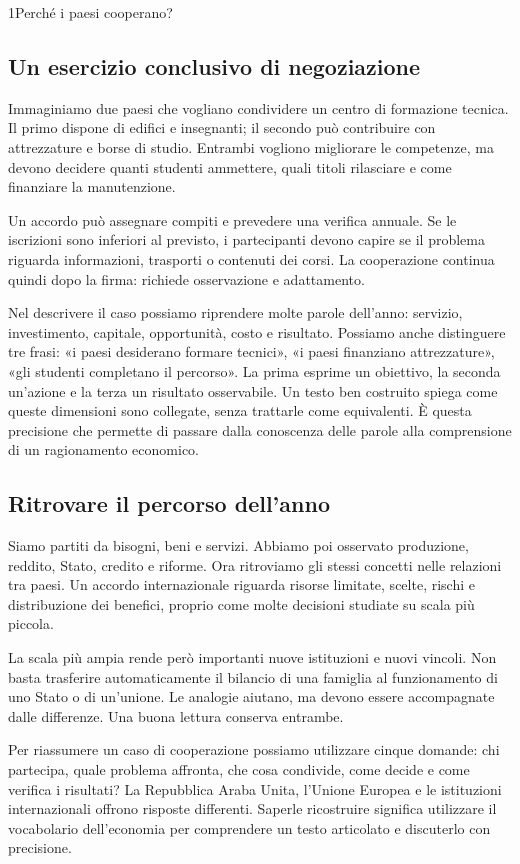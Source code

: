 \begin{lettura}{1}{Perché i paesi cooperano?}
\subsection*{Un esercizio conclusivo di negoziazione}
Immaginiamo due paesi che vogliano condividere un centro di formazione tecnica. Il primo dispone di edifici e insegnanti; il secondo può contribuire con attrezzature e borse di studio. Entrambi vogliono migliorare le competenze, ma devono decidere quanti studenti ammettere, quali titoli rilasciare e come finanziare la manutenzione.

Un accordo può assegnare compiti e prevedere una verifica annuale. Se le iscrizioni sono inferiori al previsto, i partecipanti devono capire se il problema riguarda informazioni, trasporti o contenuti dei corsi. La cooperazione continua quindi dopo la firma: richiede osservazione e adattamento.

Nel descrivere il caso possiamo riprendere molte parole dell'anno: servizio, investimento, capitale, opportunità, costo e risultato. Possiamo anche distinguere tre frasi: «i paesi desiderano formare tecnici», «i paesi finanziano attrezzature», «gli studenti completano il percorso». La prima esprime un obiettivo, la seconda un'azione e la terza un risultato osservabile. Un testo ben costruito spiega come queste dimensioni sono collegate, senza trattarle come equivalenti. È questa precisione che permette di passare dalla conoscenza delle parole alla comprensione di un ragionamento economico.

\subsection*{Ritrovare il percorso dell'anno}
Siamo partiti da bisogni, beni e servizi. Abbiamo poi osservato produzione, reddito, Stato, credito e riforme. Ora ritroviamo gli stessi concetti nelle relazioni tra paesi. Un accordo internazionale riguarda risorse limitate, scelte, rischi e distribuzione dei benefici, proprio come molte decisioni studiate su scala più piccola.

La scala più ampia rende però importanti nuove istituzioni e nuovi vincoli. Non basta trasferire automaticamente il bilancio di una famiglia al funzionamento di uno Stato o di un'unione. Le analogie aiutano, ma devono essere accompagnate dalle differenze. Una buona lettura conserva entrambe.

Per riassumere un caso di cooperazione possiamo utilizzare cinque domande: chi partecipa, quale problema affronta, che cosa condivide, come decide e come verifica i risultati? La Repubblica Araba Unita, l'Unione Europea e le istituzioni internazionali offrono risposte differenti. Saperle ricostruire significa utilizzare il vocabolario dell'economia per comprendere un testo articolato e discuterlo con precisione.




\end{lettura}
